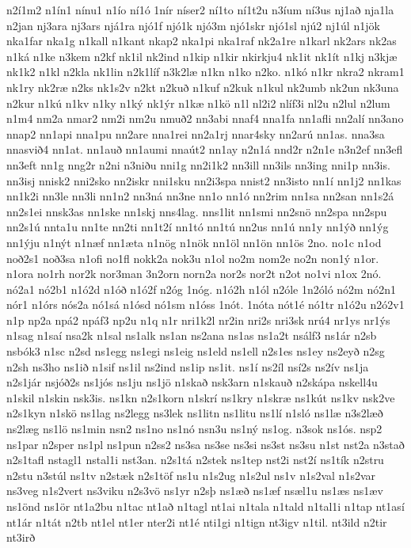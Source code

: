 {n2í1m2
n1ín1
nínu1
n1ío
ní1ó
1nír
níser2
ní1to
ní1t2u
n3íum
ní3us
nj1að
nja1la
n2jan
nj3ara
nj3ars
njá1ra
njó1f
njó1k
njó3m
njó1skr
njó1sl
njú2
nj1úl
n1jök
nka1far
nka1g
n1kall
n1kant
nkap2
nka1pi
nka1raf
nk2a1re
n1karl
nk2ars
nk2as
n1ká
n1ke
n3kem
n2kf
nk1il
nk2ind
n1kip
n1kir
nkirkju4
nk1it
nk1ít
n1kj
n3kjæ
nk1k2
n1kl
n2kla
nk1lin
n2k1líf
n3k2læ
n1kn
n1ko
n2ko.
n1kó
n1kr
nkra2
nkram1
nk1ry
nk2ræ
n2ks
nk1s2v
n2kt
n2kuð
n1kuf
n2kuk
n1kul
nk2umb
nk2un
nk3una
n2kur
n1kú
n1kv
n1ky
n1ký
nk1ýr
n1kæ
n1kö
n1l
nl2i2
nlíf3i
nl2u
n2lul
n2lum
n1m4
nm2a
nmar2
nm2i
nm2u
nmuð2
nn3abi
nnaf4
nna1fa
nn1afli
nn2alí
nn3ano
nnap2
nn1api
nna1pu
nn2are
nna1rei
nn2a1rj
nnar4sky
nn2arú
nn1as.
nna3sa
nnasvið4
nn1at.
nn1auð
nn1aumi
nnaút2
nn1ay
n2n1á
nnd2r
n2n1e
n3n2ef
nn3efl
nn3eft
nn1g
nng2r
n2ni
n3niðu
nni1g
nn2i1k2
nn3ill
nn3ils
nn3ing
nni1p
nn3is.
nn3isj
nnisk2
nni2sko
nn2iskr
nni1sku
nn2i3spa
nnist2
nn3isto
nn1í
nn1j2
nn1kas
nn1k2i
nn3le
nn3li
nn1n2
nn3ná
nn3ne
nn1o
nn1ó
nn2rim
nn1sa
nn2san
nn1s2á
nn2s1ei
nnsk3as
nn1ske
nn1skj
nns4lag.
nns1lit
nn1smi
nn2snö
nn2spa
nn2spu
nn2s1ú
nnta1u
nn1te
nn2ti
nn1t2í
nn1tó
nn1tú
nn2us
nn1ú
nn1y
nn1ýð
nn1ýg
nn1ýju
n1nýt
n1næf
nn1æta
n1nög
n1nök
nn1öl
nn1ön
nn1ös
2no.
no1c
n1od
noð2s1
noð3sa
n1ofi
no1fl
nokk2a
nok3u
n1ol
no2m
nom2e
no2n
non1ý
n1or.
n1ora
no1rh
nor2k
nor3man
3n2orn
norn2a
nor2s
nor2t
n2ot
no1vi
n1ox
2nó.
nó2a1
nó2b1
n1ó2d
n1óð
n1ó2f
n2óg
1nóg.
n1ó2h
n1ól
n2óle
1n2óló
nó2m
nó2n1
nór1
n1órs
nós2a
nó1sá
n1ósd
nó1sm
n1óss
1nót.
1nóta
nót1é
nó1tr
n1ó2u
n2ó2v1
n1p
np2a
npá2
npáf3
np2u
n1q
n1r
nri1k2l
nr2in
nri2s
nri3sk
nrú4
nr1ys
nr1ýs
n1sag
n1saí
nsa2k
n1sal
ns1alk
ns1an
ns2ana
ns1as
ns1a2t
nsálf3
ns1ár
n2sb
nsbók3
n1sc
n2sd
ns1egg
ns1egi
ns1eig
ns1eld
ns1ell
n2s1es
ns1ey
ns2eyð
n2sg
n2sh
ns3ho
ns1ið
n1sif
ns1il
ns2ind
ns1ip
ns1it.
ns1í
ns2íl
nsí2s
ns2ív
ns1ja
n2s1jár
nsjóð2s
ns1jós
ns1ju
ns1jö
n1skað
nsk3arn
n1skauð
n2skápa
nskell4u
n1skil
n1skin
nsk3is.
ns1kn
n2s1korn
n1skrí
ns1kry
n1skræ
ns1kút
ns1kv
nsk2ve
n2s1kyn
n1skö
ns1lag
ns2legg
ns3lek
ns1litn
ns1litu
ns1lí
n1sló
ns1læ
n3s2læð
ns2læg
ns1lö
ns1min
nsn2
ns1no
ns1nó
nsn3u
ns1ný
ns1og.
n3sok
ns1ós.
nsp2
ns1par
n2sper
ns1pl
ns1pun
n2ss2
ns3sa
ns3se
ns3si
ns3st
ns3su
n1st
nst2a
n3stað
n2s1tafl
nstagl1
nstal1i
nst3an.
n2s1tá
n2stek
ns1tep
nst2i
nst2í
ns1tík
n2stru
n2stu
n3stúl
ns1tv
n2stæk
n2s1töf
ns1u
n1s2ug
n1s2ul
ns1v
n1s2val
n1s2var
ns3veg
n1s2vert
ns3viku
n2s3vö
ns1yr
n2sþ
ns1æð
ns1æf
nsæl1u
ns1æs
ns1æv
ns1önd
ns1ör
nt1a2bu
n1tac
nt1að
n1tagl
nt1ai
n1tala
n1tald
n1tal1i
n1tap
nt1así
nt1ár
n1tát
n2tb
nt1el
nt1er
nter2i
nt1é
nti1gi
n1tign
nt3igv
n1til.
nt3ild
n2tir
nt3irð
}
